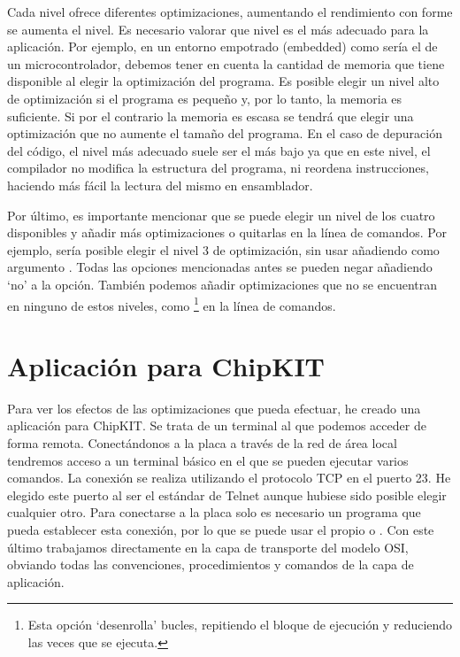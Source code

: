 Cada nivel ofrece diferentes optimizaciones, aumentando el rendimiento con forme se aumenta el nivel. Es necesario valorar que nivel es el más adecuado para la aplicación. Por ejemplo, en un entorno empotrado (embedded) como sería el de un microcontrolador, debemos tener en cuenta la cantidad de memoria que tiene disponible al elegir la optimización del programa. Es posible elegir un nivel alto de optimización si el programa es pequeño y, por lo tanto, la memoria es suficiente. Si por el contrario la memoria es escasa se tendrá que elegir una optimización que no aumente el tamaño del programa. En el caso de depuración del código, el nivel más adecuado suele ser el más bajo ya que en este nivel, el compilador no modifica la estructura del programa, ni reordena instrucciones, haciendo más fácil la lectura del mismo en ensamblador.

Por último, es importante mencionar que se puede elegir un nivel de los cuatro disponibles y añadir más optimizaciones o quitarlas en la línea de comandos. Por ejemplo, sería posible elegir el nivel 3 de optimización, sin usar  añadiendo como argumento . Todas las opciones mencionadas antes se pueden negar añadiendo `no' a la opción. También podemos añadir optimizaciones que no se encuentran en ninguno de estos niveles, como \footnote{Esta opción `desenrolla' bucles, repitiendo el bloque de ejecución y reduciendo las veces que se ejecuta.} en la línea de comandos.

\section{Aplicación para ChipKIT}

Para ver los efectos de las optimizaciones que  pueda efectuar, he creado una aplicación para ChipKIT. Se trata de un terminal al que podemos acceder de forma remota. Conectándonos a la placa a través de la red de área local tendremos acceso a un terminal básico en el que se pueden ejecutar varios comandos. La conexión se realiza utilizando el protocolo TCP en el puerto 23. He elegido este puerto al ser el estándar de Telnet aunque hubiese sido posible elegir cualquier otro. Para conectarse a la placa solo es necesario un programa que pueda establecer esta conexión, por lo que se puede usar el propio  o . Con este último trabajamos directamente en la capa de transporte del modelo OSI, obviando todas las convenciones, procedimientos y comandos de la capa de aplicación.


